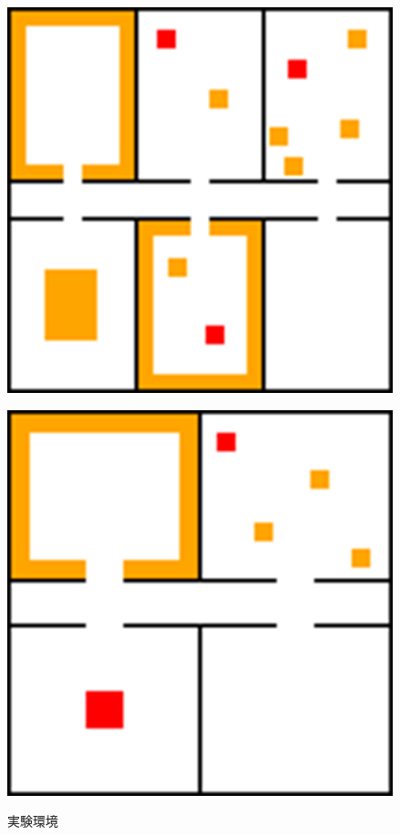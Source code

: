 \documentclass[12pt,a4j,twoside]{jarticle}
\begin{document}
  \begin{figure}
    \begin{minipage}{0.45\hsize}
      \centering
      \includegraphics[width=1.0\hsize]{figures/Graph_Office.png}
      \label{subfig:env1}
    \end{minipage}
    \hfill
    \begin{minipage}{0.52\hsize}
      \centering
      \includegraphics[width=0.865\hsize]{figures/Graph_Complex.png}
      \label{subfig:env2}
    \end{minipage}
    \caption{実験環境}\label{fig:env}
  \end{figure}
\end{document}
